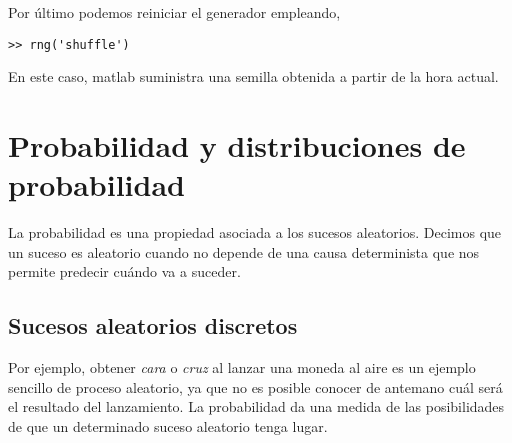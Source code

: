 Por último podemos reiniciar el generador empleando,
\begin{verbatim}
>> rng('shuffle')
\end{verbatim}
En este caso, matlab suministra una semilla obtenida a partir de la hora actual.

\section{Probabilidad y distribuciones de probabilidad}

La probabilidad es una propiedad asociada a los sucesos aleatorios. Decimos que un suceso es aleatorio cuando no depende de una causa determinista que nos permite predecir cuándo va a suceder. 

\subsection{Sucesos aleatorios discretos}
Por ejemplo, obtener \emph{cara} o \emph{cruz} al lanzar una moneda al aire es un ejemplo sencillo de proceso aleatorio, ya que no es posible conocer de antemano cuál será el resultado del lanzamiento. La probabilidad da una medida de las posibilidades de que un determinado suceso aleatorio tenga lugar.

